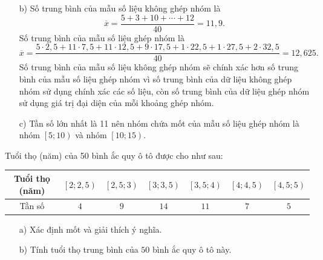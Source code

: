 \begin{bt}
{\begin{enumerate}
	\item [b)] Số trung bình của mẫu số liệu không ghép nhóm là
	$$\overline{x}=\dfrac{5+3+10+\cdots +12}{40}=11{,}9.$$
	Số trung bình của mẫu số liệu ghép nhóm là
	$$\overline{x}=\dfrac{5\cdot 2{,}5+11\cdot 7{,}5+11\cdot 12{,}5+9\cdot 17{,}5+1\cdot 22{,}5+1\cdot 27{,}5+2\cdot 32{,}5}{40}=12{,}625.$$
	Số trung bình của mẫu số liệu không ghép nhóm sẽ chính xác hơn số trung bình của mẫu số liệu ghép nhóm vì số trung bình của dữ liệu không ghép nhóm sử dụng chính xác các số liệu, còn số trung bình của dữ liệu ghép nhóm sử dụng giá trị đại diện của mỗi khoảng ghép nhóm.
	\item [c)] Tần số lớn nhất là 11 nên nhóm chứa mốt của mẫu số liệu ghép nhóm là nhóm $\left[5;10\right)$ và nhóm $\left[10;15\right)$.
\end{enumerate}
	}
\end{bt}

\begin{bt}%
Tuổi thọ (năm) của 50 bình ắc quy ô tô được cho như sau:
\begin{center}
	\begin{tabular}{|c|c|c|c|c|c|c|}
		\hline
		Tuổi thọ (năm)	& $\left[2;2{,}5 \right)$ & $\left[2{,}5;3 \right)$ & $\left[3;3{,}5 \right)$&$\left[3{,}5;4 \right)$&$\left[4;4{,}5 \right)$&$\left[4{,}5;5 \right)$  \\
		\hline
	Tần số &$4$	& $9$ & $14$ &$11$  & $7$&$5$ \\
		\hline
	\end{tabular}
\end{center}
\begin{enumerate}
	\item [a)] Xác định mốt và giải thích ý nghĩa.
	\item [b)] Tính tuổi thọ trung bình của $50$ bình ắc quy ô tô này.
\end{enumerate}	
	\loigiai{
\begin{enumerate}
	\item [a)] Tần số lớn nhất là $14$ nên nhóm chứa mốt là nhóm $\left[3;3, 5\right)$.\\
	Ta có $j=3$, $a_3=3$, $m_3=14$, $m_2=9$, $m_4=11$, $h=0$, $5$. Do đó
	$$M_o=3+\dfrac{14-9}{(14-9)+(14-11)}\cdot 0{,}5=3{,}3125.$$
	Tuổi thọ cao nhất của bình ắc quy khoảng $3{,}3125$ năm.
	\item [b)] Ta có bảng sau
	\begin{center}
	\begin{tabular}{|c|c|c|c|c|c|c|}
	\hline
	Tuổi thọ (năm)	& $2{,}25$ & $2{,}75$ & $3{,}25$&$3{,}75$&$4{,}25$&$4{,}75$  \\
	\hline
	Tần số &$4$	& $9$ & $14$ &$11$  & $7$&$5$\\
	\hline
\end{tabular}	
\end{center}
	Tuổi thọ trung bình của 50 bình ắc quy ô tô này là
	$$\overline{x}=\dfrac{2{,}25\cdot 4+2{,}75\cdot 9+3{,}25\cdot 14+3{,}75\cdot 11+4{,}25\cdot 7+4{,}75\cdot 5}{50}=3{,}48 \, \text{(năm)}.$$
\end{enumerate}	}
\end{bt}

